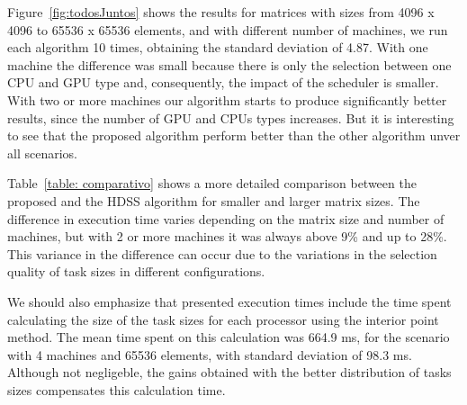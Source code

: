 \documentclass[journal]{IEEEtran}
\begin{document}

Figure~\ref{fig:todosJuntos} shows the results for matrices with sizes from 4096
x 4096 to 65536 x 65536 elements, and with different number of machines, we run each algorithm 10 times, obtaining the standard deviation of 4.87. With
one machine the difference was small because there is only the selection between
one CPU and GPU type and, consequently, the impact of the scheduler is smaller.
With two or more machines our algorithm starts to produce significantly better
results, since the number of GPU and CPUs types increases. But it is interesting
to see that the proposed algorithm perform better than the other algorithm unver
all scenarios.

Table~\ref{table: comparativo} shows a more detailed comparison between the
proposed and the HDSS algorithm for smaller and larger matrix sizes. The
difference in execution time varies depending on the matrix size and number of
machines, but with 2 or more machines it was always above 9\% and up to
28\%. This variance in the difference can occur due to the variations in the
selection quality of task sizes in different configurations.

%
We should also emphasize that presented execution times include the time spent
calculating the size of the task sizes for each processor using the interior
point method. The mean time spent on this calculation was 664.9 ms, for the scenario with 4 machines and 65536 elements, with
standard deviation of 98.3 ms. Although not negligeble, the gains obtained with
the better distribution of tasks sizes compensates this calculation time.

\end{document}
